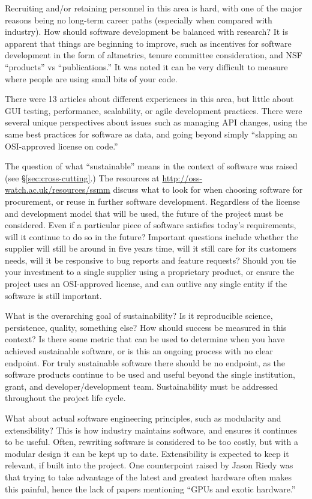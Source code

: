 \documentclass[11pt, oneside]{amsart}
\begin{document}
Recruiting and/or retaining personnel in this area is hard,
with one of the major reasons being no long-term career paths (especially when
compared with industry). How should software development be balanced with
research? It is apparent that things are beginning to improve, such as
incentives for software development in the form of altmetrics, tenure committee
consideration, and NSF ``products'' vs ``publications.'' It was noted it can be very
difficult to measure where people are using small bits of your code.

There were 13 articles about different experiences in this area, but little
about GUI testing, performance, scalability, or agile development practices.
There were several unique perspectives about issues such as managing API
changes, using the same best practices for software as data, and going beyond
simply ``slapping an OSI-approved license on code.''

The question of what ``sustainable'' means in the context of software was
raised (see \S\ref{sec:cross-cutting}.) The resources at \url{http://oss-watch.ac.uk/resources/ssmm} discuss what
to look for when choosing software for procurement, or reuse in further software
development. Regardless of the license and development model that will be used,
the future of the project must be considered. Even if a particular piece of
software satisfies today's requirements, will it continue to do so in the
future? Important questions include whether the supplier will still be around in five
years time, will it still care for its customers needs, will it be responsive to
bug reports and feature requests? Should you tie your investment to a single
supplier using a proprietary product, or ensure the project uses an OSI-approved
license, and can outlive any single entity if the software is still important.

What is the overarching goal of sustainability? Is it reproducible science,
persistence, quality, something else? How should success be measured in this
context? Is there some metric that can be used to determine when you have
achieved sustainable software, or is this an ongoing process with no clear
endpoint. For truly sustainable software there should be no endpoint, as the
software products continue to be used and useful beyond the single institution,
grant, and developer/development team. Sustainability must be addressed
throughout the project life cycle.

What about actual software engineering principles, such as modularity and
extensibility? This is how industry maintains software, and ensures it continues
to be useful. Often, rewriting software is considered to be too costly, but
with a modular design it can be kept up to date. Extensibility is expected to keep
it relevant, if built into the project. One counterpoint raised by Jason Riedy
was that trying to take advantage of the latest and greatest hardware often
makes this painful, hence the lack of papers mentioning ``GPUs and exotic
hardware.''
\end{document}
